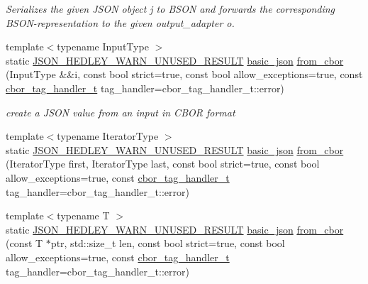 \begin{DoxyCompactItemize}
\begin{DoxyCompactList}\small\item\em Serializes the given J\+S\+ON object {\ttfamily j} to B\+S\+ON and forwards the corresponding B\+S\+O\+N-\/representation to the given output\+\_\+adapter {\ttfamily o}. \end{DoxyCompactList}\item 
{\footnotesize template$<$typename Input\+Type $>$ }\\static \hyperlink{json_8hpp_a28d7e3b2d26bd5b8a3806da3db7dea03}{J\+S\+O\+N\+\_\+\+H\+E\+D\+L\+E\+Y\+\_\+\+W\+A\+R\+N\+\_\+\+U\+N\+U\+S\+E\+D\+\_\+\+R\+E\+S\+U\+LT} \hyperlink{classnlohmann_1_1basic__json}{basic\+\_\+json} \hyperlink{classnlohmann_1_1basic__json_a44dd5635fb2da4710f6cd6e42b72773f}{from\+\_\+cbor} (Input\+Type \&\&i, const bool strict=true, const bool allow\+\_\+exceptions=true, const \hyperlink{namespacenlohmann_1_1detail_a58bb1ef1a9ad287a9cfaf1855784d9ac}{cbor\+\_\+tag\+\_\+handler\+\_\+t} tag\+\_\+handler=cbor\+\_\+tag\+\_\+handler\+\_\+t\+::error)
\begin{DoxyCompactList}\small\item\em create a J\+S\+ON value from an input in C\+B\+OR format \end{DoxyCompactList}\item 
{\footnotesize template$<$typename Iterator\+Type $>$ }\\static \hyperlink{json_8hpp_a28d7e3b2d26bd5b8a3806da3db7dea03}{J\+S\+O\+N\+\_\+\+H\+E\+D\+L\+E\+Y\+\_\+\+W\+A\+R\+N\+\_\+\+U\+N\+U\+S\+E\+D\+\_\+\+R\+E\+S\+U\+LT} \hyperlink{classnlohmann_1_1basic__json}{basic\+\_\+json} \hyperlink{classnlohmann_1_1basic__json_aba4f6fc79cc405fb212ea3d992334e71}{from\+\_\+cbor} (Iterator\+Type first, Iterator\+Type last, const bool strict=true, const bool allow\+\_\+exceptions=true, const \hyperlink{namespacenlohmann_1_1detail_a58bb1ef1a9ad287a9cfaf1855784d9ac}{cbor\+\_\+tag\+\_\+handler\+\_\+t} tag\+\_\+handler=cbor\+\_\+tag\+\_\+handler\+\_\+t\+::error)
\item 
{\footnotesize template$<$typename T $>$ }\\static \hyperlink{json_8hpp_a28d7e3b2d26bd5b8a3806da3db7dea03}{J\+S\+O\+N\+\_\+\+H\+E\+D\+L\+E\+Y\+\_\+\+W\+A\+R\+N\+\_\+\+U\+N\+U\+S\+E\+D\+\_\+\+R\+E\+S\+U\+LT} \hyperlink{classnlohmann_1_1basic__json}{basic\+\_\+json} \hyperlink{classnlohmann_1_1basic__json_a188755c8cda27e2afb03c016c14125d8}{from\+\_\+cbor} (const T $\ast$ptr, std\+::size\+\_\+t len, const bool strict=true, const bool allow\+\_\+exceptions=true, const \hyperlink{namespacenlohmann_1_1detail_a58bb1ef1a9ad287a9cfaf1855784d9ac}{cbor\+\_\+tag\+\_\+handler\+\_\+t} tag\+\_\+handler=cbor\+\_\+tag\+\_\+handler\+\_\+t\+::error)

\end{DoxyCompactItemize}
